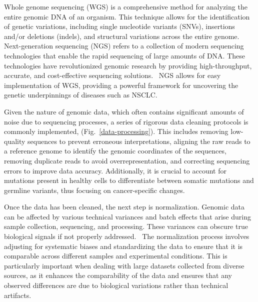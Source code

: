 \vspace{1em}
\noindent
Whole genome sequencing (WGS) is a comprehensive method for analyzing the entire genomic DNA of an organism. 
This technique allows for the identification of genetic variations, including single nucleotide variants (SNVs), 
insertions and/or deletions (indels), and structural variations across the entire genome. 
Next-generation sequencing (NGS) refers to a collection of modern sequencing technologies that enable the rapid sequencing of large amounts of DNA. 
These technologies have revolutionized genomic research by providing high-throughput, accurate, and cost-effective sequencing solutions.~\cite{koboldt_best_2020-1} 
NGS allows for easy implementation of WGS, providing a powerful framework for uncovering the genetic underpinnings of diseases such as NSCLC.

\vspace{1em}
\noindent
Given the nature of genomic data, which often contains significant amounts of noise due to sequencing processes, 
a series of rigorous data cleaning protocols is commonly implemented, (Fig.~\ref{data-processing}). 
This includes removing low-quality sequences to prevent erroneous interpretations, 
aligning the raw reads to a reference genome to identify the genomic coordinates of the sequences, 
removing duplicate reads to avoid overrepresentation, and correcting sequencing errors to improve data accuracy. 
Additionally, it is crucial to account for mutations present in healthy cells to differentiate between 
somatic mutations and germline variants, thus focusing on cancer-specific changes.~\cite{koboldt_best_2020-1,gerstung_evolutionary_2020}

\vspace{1em}
\noindent
Once the data has been cleaned, the next step is normalization. 
Genomic data can be affected by various technical variances and batch effects that arise during sample collection, sequencing, and processing. 
These variances can obscure true biological signals if not properly addressed.~\cite{jaffe_practical_2015} 
The normalization process involves adjusting for systematic biases and standardizing the data to 
ensure that it is comparable across different samples and experimental conditions. 
This is particularly important when dealing with large datasets collected from diverse sources, 
as it enhances the comparability of the data and ensures that any observed differences 
are due to biological variations rather than technical artifacts.


